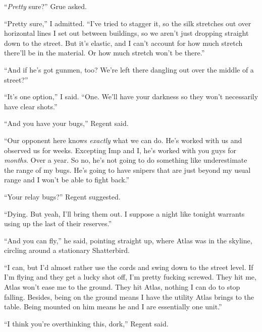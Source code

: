 ``\emph{Pretty} sure?'' Grue asked.



``Pretty sure,'' I admitted.  ``I've tried to stagger it, so the silk stretches out over horizontal lines I set out between buildings, so we aren't just dropping straight down to the street.  But it's elastic, and I can't account for how much stretch there'll be in the material.  Or how much stretch won't be there.''



``And if he's got gunmen, too?  We're left there dangling out over the middle of a street?''



``It's one option,'' I said.  ``One.  We'll have your darkness so they won't necessarily have clear shots.''



``And you have your bugs,'' Regent said.



``Our opponent here knows \emph{exactly} what we can do.  He's worked with us and observed us for weeks.  Excepting Imp and I, he's worked with you guys for \emph{months}.  Over a year.  So no, he's not going to do something like underestimate the range of my bugs.  He's going to have snipers that are just beyond my usual range and I won't be able to fight back.''



``Your relay bugs?''  Regent suggested.



``Dying.  But yeah, I'll bring them out.  I suppose a night like tonight warrants using up the last of their reserves.''



``And you can fly,'' he said, pointing straight up, where Atlas was in the skyline, circling around a stationary Shatterbird.



``I can, but I'd almost rather use the cords and swing down to the street level.  If I'm flying and they get a lucky shot off, I'm pretty fucking screwed.  They hit me, Atlas won't ease me to the ground.  They hit Atlas, nothing I can do to stop falling.  Besides, being on the ground means I have the utility Atlas brings to the table.  Being mounted on him means he and I are essentially one unit.''



``I think you're overthinking this, dork,'' Regent said.



